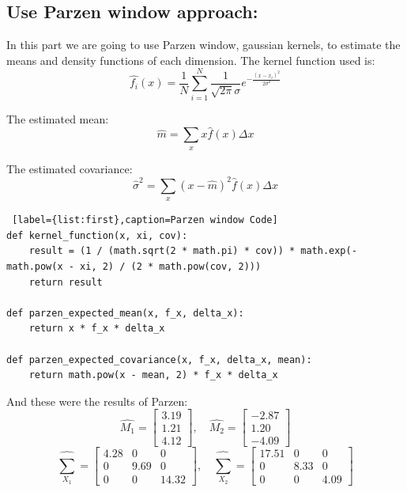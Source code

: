 \documentclass[11pt, oneside]{article}   	%
\begin{document}
\subsection{Use Parzen window approach:}
In this part we are going to use Parzen window, gaussian kernels, to estimate the means and density functions of each dimension. The kernel function used is:
$$\hat{f_i}(x)=\frac{1}{N}\sum_{i=1}^{N}\frac{1}{\sqrt{2\pi}\sigma} e^{-\frac{(x-x_i)^2}{2\sigma^2}} $$

The estimated mean:
$$\hat{m}=\sum_{x}x\hat{f}(x)\Delta x $$

The estimated covariance:
$$\hat{\sigma}^2=\sum_{x}(x-\hat{m})^2\hat{f}(x)\Delta x$$

\begin{lstlisting} [label={list:first},caption=Parzen window Code]
def kernel_function(x, xi, cov):
    result = (1 / (math.sqrt(2 * math.pi) * cov)) * math.exp(-math.pow(x - xi, 2) / (2 * math.pow(cov, 2)))
    return result

def parzen_expected_mean(x, f_x, delta_x):
    return x * f_x * delta_x

def parzen_expected_covariance(x, f_x, delta_x, mean):
    return math.pow(x - mean, 2) * f_x * delta_x
\end{lstlisting}

And these were the results of Parzen:$$\hat{M_1} = \begin{bmatrix}
3.19 \\ 1.21 \\ 4.12 
\end{bmatrix},\quad \hat{M_2} = \begin{bmatrix}
-2.87 \\ 1.20 \\ -4.09 
\end{bmatrix}$$
$$\hat{\sum_{X_1}} = \begin{bmatrix}
4.28 & 0 & 0 \\
0 & 9.69 & 0 \\
0 & 0 & 14.32 
\end{bmatrix}, \quad \hat{\sum_{X_2}} = \begin{bmatrix}
17.51 & 0 & 0 \\
0 & 8.33 & 0 \\
0 & 0 & 4.09 
\end{bmatrix}$$\\
\end{document}
